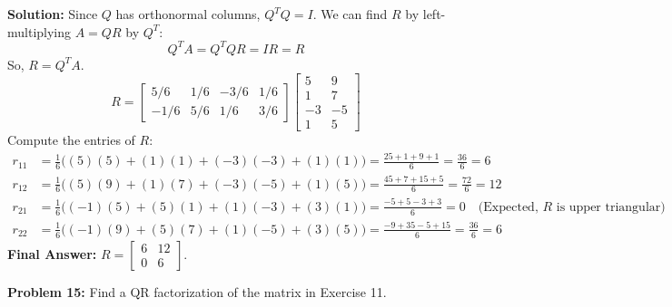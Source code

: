 \documentclass[11pt, letterpaper]{article}
\theoremstyle{definition}
\theoremstyle{remark}
\begin{document}
\textbf{Solution:}
Since $Q$ has orthonormal columns, $Q^T Q = I$. We can find $R$ by left-multiplying $A = QR$ by $Q^T$:
\[ Q^T A = Q^T Q R = I R = R \]
So, $R = Q^T A$.
\[ R = \begin{bmatrix} 5/6 & 1/6 & -3/6 & 1/6 \\ -1/6 & 5/6 & 1/6 & 3/6 \end{bmatrix} \begin{bmatrix} 5 & 9 \\ 1 & 7 \\ -3 & -5 \\ 1 & 5 \end{bmatrix} \]
Compute the entries of $R$:
\begin{align*}
    r_{11} &= \frac{1}{6} \big( (5)(5) + (1)(1) + (-3)(-3) + (1)(1) \big) = \frac{25 + 1 + 9 + 1}{6} = \frac{36}{6} = 6 \\
    r_{12} &= \frac{1}{6} \big( (5)(9) + (1)(7) + (-3)(-5) + (1)(5) \big) = \frac{45 + 7 + 15 + 5}{6} = \frac{72}{6} = 12 \\
    r_{21} &= \frac{1}{6} \big( (-1)(5) + (5)(1) + (1)(-3) + (3)(1) \big) = \frac{-5 + 5 - 3 + 3}{6} = 0 \quad \text{(Expected, } R \text{ is upper triangular)} \\
    r_{22} &= \frac{1}{6} \big( (-1)(9) + (5)(7) + (1)(-5) + (3)(5) \big) = \frac{-9 + 35 - 5 + 15}{6} = \frac{36}{6} = 6
\end{align*}
\textbf{Final Answer:} $R = \begin{bmatrix} 6 & 12 \\ 0 & 6 \end{bmatrix}$.

\vspace{1em}
\textbf{Problem 15:} 
Find a QR factorization of the matrix in Exercise 11.
\end{document}
